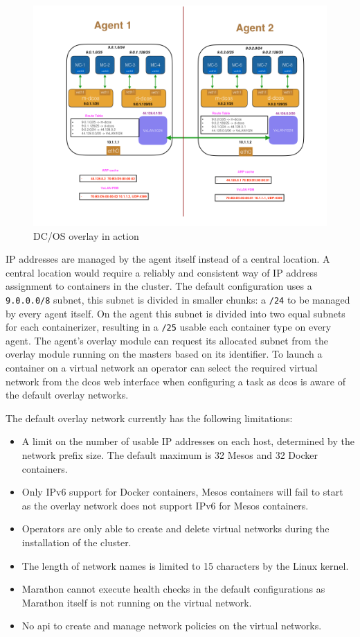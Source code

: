 \begin{figure}
    \centering
    \includegraphics[width=1\columnwidth]{images/dcos-overlay-arch}
    \caption{DC/OS overlay in action\cite{dcos_overlay_arch}}
    \label{fig:dcos-overlay-arch}
\end{figure}

IP addresses are managed by the agent itself instead of a central location. A central location would require a reliably and consistent way of IP address assignment to containers in the cluster. The default configuration uses a \texttt{9.0.0.0/8} subnet, this subnet is divided in smaller chunks: a \texttt{/24} to be managed by every agent itself. On the agent this subnet is divided into two equal subnets for each containerizer, resulting in a \texttt{/25} usable each container type on every agent. The agent's overlay module can request its allocated subnet from the overlay module running on the masters based on its identifier. To launch a container on a virtual network an operator can select the required virtual network from the \gls{dcos} web interface when configuring a task as \gls{dcos} is aware of the default overlay networks.

The default overlay network currently has the following limitations:
\begin{itemize}
    \item A limit on the number of usable IP addresses on each host, determined by the network prefix size. The default maximum is 32 Mesos and 32 Docker containers.
    \item Only IPv6 support for Docker containers, Mesos containers will fail to start as the overlay network does not support IPv6 for Mesos containers.
    \item Operators are only able to create and delete virtual networks during the installation of the cluster.
    \item The length of network names is limited to 15 characters by the Linux kernel.
    \item Marathon cannot execute health checks in the default configurations as Marathon itself is not running on the virtual network.
    \item No \gls{api} to create and manage network policies on the virtual networks.
\end{itemize}

